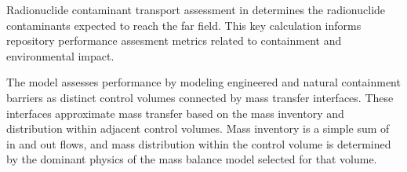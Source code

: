 Radionuclide contaminant transport assessment in \Cyder determines the 
radionuclide contaminants expected to reach the far field. This key calculation 
informs repository performance assesment metrics related to containment and 
environmental impact.

The \Cyder model assesses performance by modeling 
engineered and natural containment barriers as distinct control volumes connected 
by mass transfer interfaces. These interfaces approximate mass transfer based on 
the mass inventory and distribution within adjacent 
control volumes. Mass inventory is a simple sum of in and out flows, 
and mass distribution within the control volume is determined by the dominant 
physics of the mass balance model selected for that volume.

